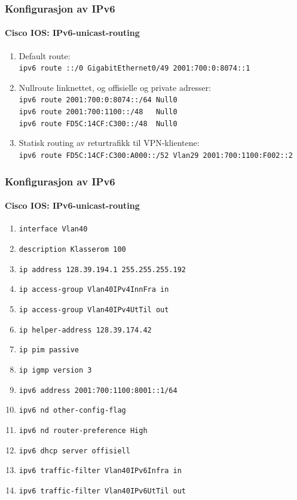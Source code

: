 \begin{frame}%
  \frametitle{Konfigurasjon av IPv6}
  \framesubtitle{Cisco IOS: IPv6-unicast-routing}
  \begin{enumerate}[<+->]
  \item Default route:\\
    \alert{\texttt{ipv6 route ::/0 GigabitEthernet0/49 2001:700:0:8074::1}}
  \item Nullroute linknettet, og offisielle og private adresser:\\
    \alert{\texttt{ipv6 route 2001:700:0:8074::/64 Null0}}\\
    \alert{\texttt{ipv6 route 2001:700:1100::/48\ \ \ Null0}}\\
    \alert{\texttt{ipv6 route FD5C:14CF:C300::/48\ \  Null0}}
  \item Statisk routing av returtrafikk til VPN-klientene:\\
    \alert{\texttt{ipv6 route FD5C:14CF:C300:A000::/52 Vlan29 2001:700:1100:F002::2}}
  \end{enumerate}
\end{frame}

\begin{frame}%
  \frametitle{Konfigurasjon av IPv6}
  \framesubtitle{Cisco IOS: IPv6-unicast-routing}
  \begin{enumerate}[<+->]
  \item \alert{\texttt{interface Vlan40}}
  \item \texttt{description Klasserom 100}
  \item \texttt{ip address 128.39.194.1 255.255.255.192}
  \item \texttt{ip access-group Vlan40IPv4InnFra in}
  \item \texttt{ip access-group Vlan40IPv4UtTil out}
  \item \texttt{ip helper-address 128.39.174.42}
  \item \texttt{ip pim passive}
  \item \texttt{ip igmp version 3}
  \item \alert{\texttt{ipv6 address 2001:700:1100:8001::1/64}}
  \item \alert{\texttt{ipv6 nd other-config-flag}}
  \item \alert{\texttt{ipv6 nd router-preference High}}
  \item \alert{\texttt{ipv6 dhcp server offisiell}}
  \item \alert{\texttt{ipv6 traffic-filter Vlan40IPv6Infra in}}
  \item \alert{\texttt{ipv6 traffic-filter Vlan40IPv6UtTil out}}
  \end{enumerate}
\end{frame}

